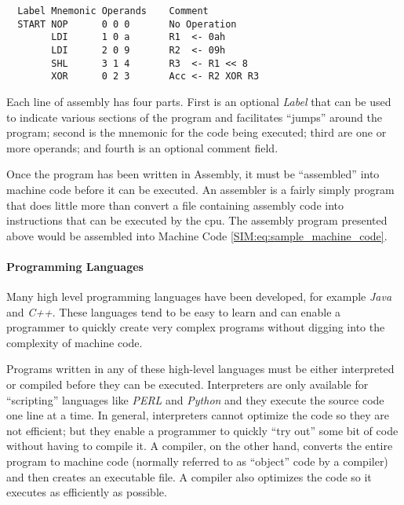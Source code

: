 \begin{verbatim}
  Label Mnemonic Operands    Comment
  START NOP      0 0 0       No Operation
        LDI      1 0 a       R1  <- 0ah
        LDI      2 0 9       R2  <- 09h
        SHL      3 1 4       R3  <- R1 << 8
        XOR      0 2 3       Acc <- R2 XOR R3
\end{verbatim}

Each line of assembly has four parts. First is an optional \emph{Label} that can be used to indicate various sections of the program and facilitates ``jumps'' around the program; second is the mnemonic for the code being executed; third are one or more operands; and fourth is an optional comment field.


Once the program has been written in Assembly, it must be ``assembled'' into machine code before it can be executed. An assembler is a fairly simply program that does little more than convert a file containing assembly code into instructions that can be executed by the \gls{cpu}. The assembly program presented above would be assembled into Machine Code \ref{SIM:eq:sample_machine_code}.

\paragraph{Programming Languages}

Many high level programming languages have been developed, for example \emph{Java} and \emph{C++}. These languages tend to be easy to learn and can enable a programmer to quickly create very complex programs without digging into the complexity of machine code.

Programs written in any of these high-level languages must be either interpreted or compiled before they can be executed. Interpreters are only available for ``scripting'' languages like \emph{PERL} and \emph{Python} and they execute the source code one line at a time. In general, interpreters cannot optimize the code so they are not efficient; but they enable a programmer to quickly ``try out'' some bit of code without having to compile it. A compiler, on the other hand, converts the entire program to machine code (normally referred to as ``object'' code by a compiler) and then creates an executable file. A compiler also optimizes the code so it executes as efficiently as possible.

